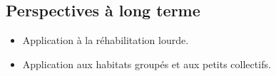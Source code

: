 \documentclass[xcolor=x11names, compress, 11pt]{beamer}
\begin{document}
\subsection{Perspectives à long terme}
\begin{frame}[c]
    \vfill
    \begin{itemize}
        \item Application à la réhabilitation lourde.
    \vfill
        \item<2-> Application aux habitats groupés et aux petits collectifs.
    \end{itemize}
    \vfill
\end{frame}












\end{document}
